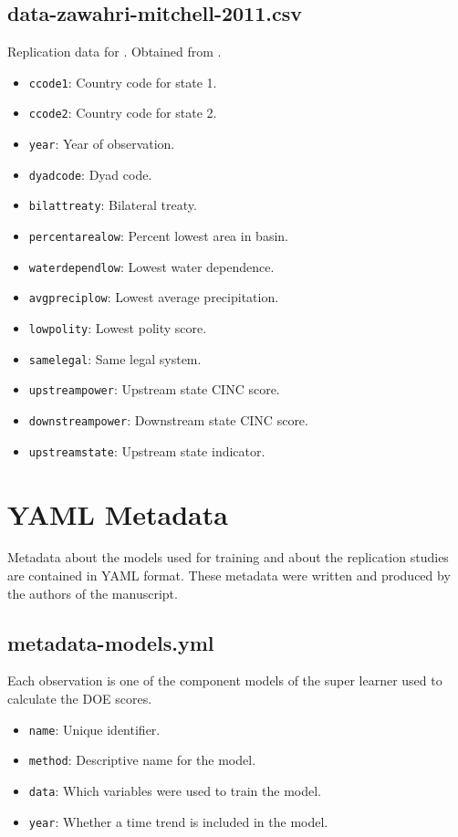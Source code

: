 \documentclass[12pt]{article}
\begin{document}
\subsection{data-zawahri-mitchell-2011.csv}

Replication data for \citet{Zawahri:2011iy}.
Obtained from \citet{zawahri2011data}.

\begin{itemize}
  \item \texttt{ccode1}: Country code for state 1.
  \item \texttt{ccode2}: Country code for state 2.
  \item \texttt{year}: Year of observation.
  \item \texttt{dyadcode}: Dyad code.
  \item \texttt{bilattreaty}: Bilateral treaty.
  \item \texttt{percentarealow}: Percent lowest area in basin.
  \item \texttt{waterdependlow}: Lowest water dependence.
  \item \texttt{avgpreciplow}: Lowest average precipitation.
  \item \texttt{lowpolity}: Lowest polity score.
  \item \texttt{samelegal}: Same legal system.
  \item \texttt{upstreampower}: Upstream state CINC score.
  \item \texttt{downstreampower}: Downstream state CINC score.
  \item \texttt{upstreamstate}: Upstream state indicator.
\end{itemize}


\section{YAML Metadata}

Metadata about the models used for training and about the replication studies are contained in YAML format.
These metadata were written and produced by the authors of the manuscript.

\subsection{metadata-models.yml}

Each observation is one of the component models of the super learner used to calculate the DOE scores.

\begin{itemize}
  \item \texttt{name}: Unique identifier.
  \item \texttt{method}: Descriptive name for the model.
  \item \texttt{data}: Which variables were used to train the model.
  \item \texttt{year}: Whether a time trend is included in the model.
\end{itemize}
\end{document}
